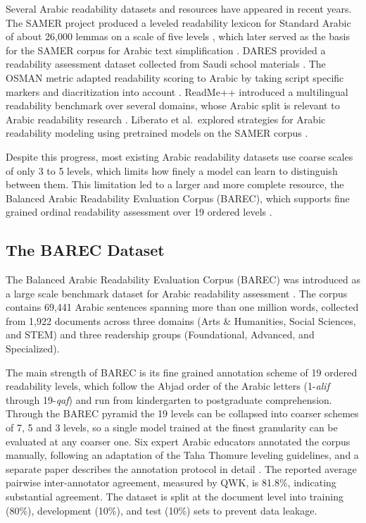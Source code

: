 Several Arabic readability datasets and resources have appeared in recent years. The SAMER project produced a leveled readability lexicon for Standard Arabic of about 26,000 lemmas on a scale of five levels \cite{alkhalil2020samer}, which later served as the basis for the SAMER corpus for Arabic text simplification \cite{alhafni2024samer}. DARES provided a readability assessment dataset collected from Saudi school materials \cite{elhaj2024dares}. The OSMAN metric adapted readability scoring to Arabic by taking script specific markers and diacritization into account \cite{elhaj2016osman}. ReadMe++ introduced a multilingual readability benchmark over several domains, whose Arabic split is relevant to Arabic readability research \cite{naous2024readme}. Liberato et al.\ explored strategies for Arabic readability modeling using pretrained models on the SAMER corpus \cite{liberato2024strategies}.

Despite this progress, most existing Arabic readability datasets use coarse scales of only 3 to 5 levels, which limits how finely a model can learn to distinguish between them. This limitation led to a larger and more complete resource, the Balanced Arabic Readability Evaluation Corpus (BAREC), which supports fine grained ordinal readability assessment over 19 ordered levels \cite{elmadani2025barec}.

\subsection{The BAREC Dataset}

The Balanced Arabic Readability Evaluation Corpus (BAREC) was introduced as a large scale benchmark dataset for Arabic readability assessment \cite{elmadani2025barec}. The corpus contains 69,441 Arabic sentences spanning more than one million words, collected from 1,922 documents across three domains (Arts \& Humanities, Social Sciences, and STEM) and three readership groups (Foundational, Advanced, and Specialized).

The main strength of BAREC is its fine grained annotation scheme of 19 ordered readability levels, which follow the Abjad order of the Arabic letters (1-\textit{alif} through 19-\textit{qaf}) and run from kindergarten to postgraduate comprehension. Through the BAREC pyramid the 19 levels can be collapsed into coarser schemes of 7, 5 and 3 levels, so a single model trained at the finest granularity can be evaluated at any coarser one. Six expert Arabic educators annotated the corpus manually, following an adaptation of the Taha Thomure leveling guidelines, and a separate paper describes the annotation protocol in detail \cite{habash2025guidelines}. The reported average pairwise inter-annotator agreement, measured by QWK, is 81.8\%, indicating substantial agreement. The dataset is split at the document level into training (80\%), development (10\%), and test (10\%) sets to prevent data leakage.


